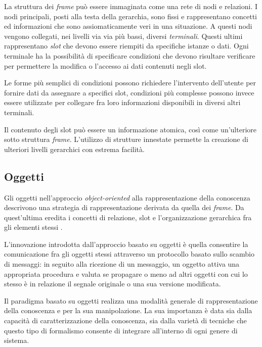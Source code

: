 La struttura dei \emph{frame} può essere immaginata come una rete di nodi e relazioni. I nodi principali, posti alla testa della gerarchia, sono fissi e rappresentano concetti ed informazioni che sono assiomaticamente veri in una situazione. A questi nodi vengono collegati, nei livelli via via più bassi, diversi \emph{terminali}. Questi ultimi rappresentano \emph{slot} che devono essere riempiti da specifiche istanze o dati. Ogni terminale ha la possibilità di specificare condizioni che devono risultare verificare per permettere la modifica o l'accesso ai dati contenuti negli slot. 

Le forme più semplici di condizioni possono richiedere l'intervento dell'utente per fornire dati da assegnare a specifici slot, condizioni più complesse possono invece essere utilizzate per collegare fra loro informazioni disponibili in diversi altri terminali. 

Il contenuto degli slot può essere un informazione atomica, così come un'ulteriore sotto struttura \emph{frame}. L'utilizzo di strutture innestate permette la creazione di ulteriori livelli gerarchici con estrema facilità. \cite{minsky1974} 

\subsection{Oggetti}
Gli oggetti nell'approccio \emph{object-oriented} alla rappresentazione della conoscenza descrivono una strategia di rappresentazione derivata da quella dei \emph{frame}. Da quest'ultima eredita i concetti di relazione, slot e l'organizzazione gerarchica fra gli elementi stessi \cite{holsapple1994object}.

L'innovazione introdotta dall'approccio basato su oggetti è quella consentire la comunicazione fra gli oggetti stessi attraverso un protocollo basato sullo scambio di messaggi: in seguito alla ricezione di un messaggio, un oggetto attiva una appropriata procedura e valuta se propagare o meno ad altri oggetti con cui lo stesso è in relazione il segnale originale o una sua versione modificata. \cite{development1993}

Il paradigma basato su oggetti realizza una modalità generale di rappresentazione della conoscenza e per la sua manipolazione. La sua importanza è data sia dalla capacità di caratterizzazione della conoscenza, sia dalla varietà di tecniche che questo tipo di formalismo consente di integrare all'interno di ogni genere di sistema. \cite{holsapple1994object}

